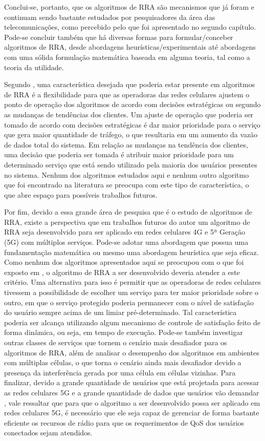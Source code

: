 Conclui-se, portanto, que os algoritmos de RRA são mecanismos que já foram e continuam sendo bastante estudados por pesquisadores da área das telecomunicações, como percebido pelo que foi apresentado no segundo capítulo. Pode-se concluir também que há diversas formas para formular/conceber algoritmos de RRA, desde abordagens heurísticas/experimentais até abordagens com uma sólida formulação matemática baseada em alguma teoria, tal como a teoria da utilidade. 

Segundo , uma característica desejada que poderia estar presente em algoritmos de RRA é a flexibilidade para que as operadoras das redes celulares ajustem o ponto de operação dos algoritmos de acordo com decisões estratégicas ou segundo as mudanças de tendências dos clientes. Um ajuste de operação que poderia ser tomado de acordo com decisões estratégicas é dar maior prioridade para o serviço que gera maior quantidade de tráfego, o que resultaria em um aumento da vazão de dados total do sistema. Em relação as mudanças na tendência dos clientes, uma decisão que poderia ser tomada é atribuir maior prioridade para um determinado serviço que está sendo utilizado pela maioria dos usuários presentes no sistema. Nenhum dos algoritmos estudados aqui e nenhum outro algoritmo que foi encontrado na literatura se preocupa com este tipo de característica, o que abre espaço para possíveis trabalhos futuros.

Por fim, devido a essa grande área de pesquisa que é o estudo de algoritmos de RRA, existe a perspectiva que em trabalhos futuros do autor um algoritmo de RRA seja desenvolvido para ser aplicado em redes celulares 4G e 5ª Geração (5G) com múltiplos serviços. Pode-se adotar uma abordagem que possua uma fundamentação matemática ou mesmo uma abordagem heurística que seja eficaz. Como nenhum dos algoritmos apresentados aqui se preocupou com o que foi exposto em , o algoritmo de RRA a ser desenvolvido deveria atender a este critério. Uma alternativa para isso é permitir que as operadoras de redes celulares tivessem a possibilidade de escolher um serviço para ter maior prioridade sobre o outro, em que o serviço protegido poderia permanecer com o nível de satisfação do usuário sempre acima de um limiar pré-determinado. Tal característica poderia ser alcança utilizando algum mecanismo de controle de satisfação feito de forma dinâmica, ou seja, em tempo de execução. Pode-se também investigar outras classes de serviços que tornem o cenário mais desafiador para os algoritmos de RRA, além de analisar o desempenho dos algoritmos em ambientes com múltiplas células, o que torna o cenário ainda mais desafiador devido a presença da interferência gerada por uma célula em células vizinhas. Para finalizar, devido a grande quantidade de usuários que está projetada para acessar as redes celulares 5G e a grande quantidade de dados que usuários vão demandar \cite{osseiran2014scenarios}, vale ressaltar que para que o algoritmo a ser desenvolvido possa ser aplicado em redes celulares 5G, é necessário que ele seja capaz de gerenciar de forma bastante eficiente os recursos de rádio para que os requerimentos de QoS dos usuários conectados sejam atendidos.
